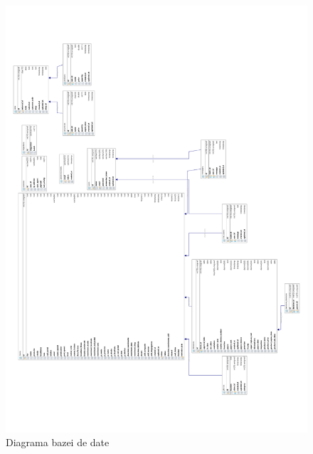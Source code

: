 	\begin{figure}[ht]
		\centering
		\vspace*{-2in}
		\hspace*{-1in}
     		\includegraphics[width=1.4\textwidth,height=1.4\textheight,keepaspectratio]{../imagini/database_diagram.pdf}
		\caption{Diagrama bazei de date}
		\label{fig:database_diagram}
	\end{figure}
